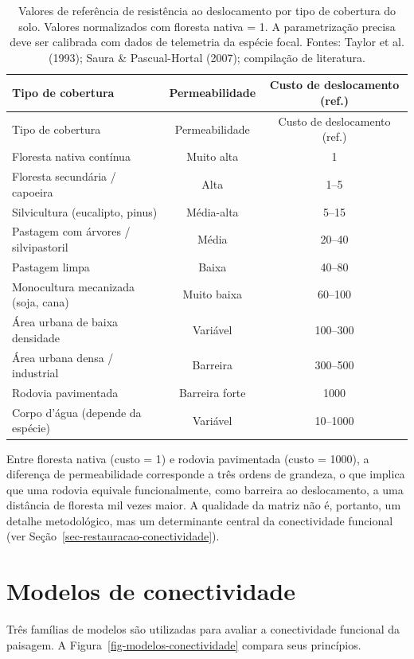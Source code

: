\documentclass[
  portuguese,
  11pt,
  a4paper,
  open=any]{scrbook}
\begin{document}
\begin{longtable}[]{@{}lcc@{}}
\caption{Valores de referência de resistência ao deslocamento por tipo
de cobertura do solo. Valores normalizados com floresta nativa = 1. A
parametrização precisa deve ser calibrada com dados de telemetria da
espécie focal. Fontes: Taylor et al. (1993); Saura \& Pascual-Hortal
(2007); compilação de
literatura.}\label{tbl-resistencia-matriz}\tabularnewline
\toprule\noalign{}
Tipo de cobertura & Permeabilidade & Custo de deslocamento (ref.) \\
\midrule\noalign{}
\endfirsthead
\toprule\noalign{}
Tipo de cobertura & Permeabilidade & Custo de deslocamento (ref.) \\
\midrule\noalign{}
\endhead
\bottomrule\noalign{}
\endlastfoot
Floresta nativa contínua & Muito alta & 1 \\
Floresta secundária / capoeira & Alta & 1--5 \\
Silvicultura (eucalipto, pinus) & Média-alta & 5--15 \\
Pastagem com árvores / silvipastoril & Média & 20--40 \\
Pastagem limpa & Baixa & 40--80 \\
Monocultura mecanizada (soja, cana) & Muito baixa & 60--100 \\
Área urbana de baixa densidade & Variável & 100--300 \\
Área urbana densa / industrial & Barreira & 300--500 \\
Rodovia pavimentada & Barreira forte & 1000 \\
Corpo d'água (depende da espécie) & Variável & 10--1000 \\
\end{longtable}

Entre floresta nativa (custo = 1) e rodovia pavimentada (custo = 1000),
a diferença de permeabilidade corresponde a três ordens de grandeza, o
que implica que uma rodovia equivale funcionalmente, como barreira ao
deslocamento, a uma distância de floresta mil vezes maior. A qualidade
da matriz não é, portanto, um detalhe metodológico, mas um determinante
central da conectividade funcional (ver
Seção~\ref{sec-restauracao-conectividade}).

\section{Modelos de conectividade}\label{modelos-de-conectividade}

Três famílias de modelos são utilizadas para avaliar a conectividade
funcional da paisagem. A Figura~\ref{fig-modelos-conectividade} compara
seus princípios.
\end{document}
